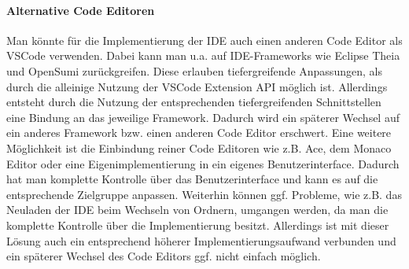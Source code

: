 \paragraph{Alternative Code Editoren} Man könnte für die Implementierung der IDE auch einen anderen Code Editor als \ac{VSCode} verwenden. Dabei kann man u.a. auf IDE-Frameworks wie Eclipse Theia und OpenSumi zurückgreifen. Diese erlauben tiefergreifende Anpassungen, als durch die alleinige Nutzung der VSCode Extension API möglich ist. Allerdings entsteht durch die Nutzung der entsprechenden tiefergreifenden Schnittstellen eine Bindung an das jeweilige Framework. Dadurch wird ein späterer Wechsel auf ein anderes Framework bzw. einen anderen Code Editor erschwert. Eine weitere Möglichkeit ist die Einbindung reiner Code Editoren wie z.B. Ace, dem Monaco Editor oder eine Eigenimplementierung in ein eigenes Benutzerinterface. Dadurch hat man komplette Kontrolle über das Benutzerinterface und kann es auf die entsprechende Zielgruppe anpassen. Weiterhin können ggf. Probleme, wie z.B. das Neuladen der IDE beim Wechseln von Ordnern, umgangen werden, da man die komplette Kontrolle über die Implementierung besitzt. Allerdings ist mit dieser Lösung auch ein entsprechend höherer Implementierungsaufwand verbunden und ein späterer Wechsel des Code Editors ggf. nicht einfach möglich.

